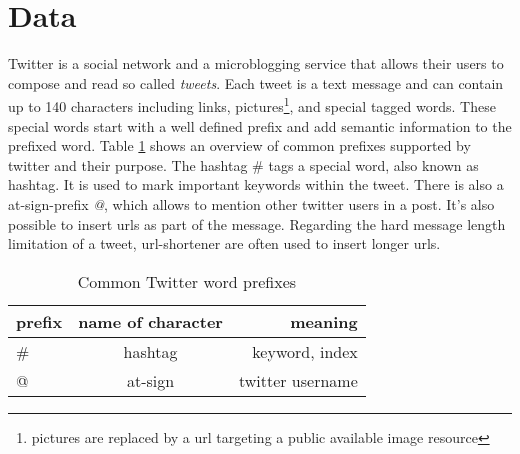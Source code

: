 \section{Data}
Twitter is a social network and a microblogging service that
allows their users to compose and read so called 
\emph{tweets}. Each tweet 
is a text message and can contain up to 140 characters
including links, pictures\footnote{pictures are replaced 
by a url targeting a public available image resource}, and special tagged words.
These special words start with a well defined prefix 
and add semantic information to the prefixed word.
Table \ref{tab:twitterprefixes} shows an overview of 
common prefixes supported by twitter and their purpose. 
The hashtag \# tags a special word, also known as hashtag. 
It is used to mark important keywords within the tweet.
There is also a at-sign-prefix \emph{@}, which allows 
to mention other twitter users in a post. It's also possible to 
insert urls as part of the message. Regarding the hard message 
length limitation of a tweet, url-shortener are often used to
 insert longer urls.

\begin{table}[H]
\centering
\begin{tabular}{ l | c | r }                 
  prefix & name of character & meaning  \\
  \hline
  \# &  hashtag & keyword, index \\
  @ & at-sign & twitter username \\
  \hline
\end{tabular}
\caption{Common Twitter word prefixes}
\label{tab:twitterprefixes}
\end{table}